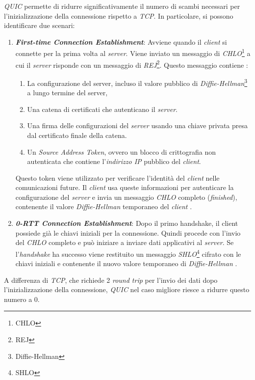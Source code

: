 \noindent \emph{QUIC} permette di ridurre significativamente il numero di scambi necessari per l'inizializzazione della connessione rispetto a \emph{TCP}. In particolare, si possono identificare due scenari:
\begin{enumerate}
    \item \textit{\textbf{First-time Connection Establishment}}: Avviene quando il \emph{client} si connette per la prima volta al \emph{server}. Viene inviato un messaggio di \emph{CHLO}\footnote{\gls{CHLO}} a cui il \emph{server} risponde con un messaggio di \emph{REJ}\footnote{\gls{REJ}}. 
    Questo messaggio contiene : 

        \begin{enumerate}[label=\roman*]
            \item La configurazione del server, incluso il valore pubblico di \emph{Diffie-Hellman}\footnote{\gls{Diffie-Hellman}} a lungo termine del server,
            \item Una catena di certificati che autenticano il \emph{server}.
            \item Una firma delle configurazioni del \emph{server} usando una chiave privata presa dal certificato finale della catena.
            \item Un \emph{Source Address Token}, ovvero un blocco di crittografia non autenticata che contiene l'\emph{indirizzo IP} pubblico del \emph{client}.
        \end{enumerate}
        
    Questo token viene utilizzato per verificare l'identità del \emph{client} nelle comunicazioni future. Il \emph{client} usa queste informazioni per autenticare la configurazione del \emph{server} e invia un messaggio \emph{CHLO} completo (\emph{finished}), contenente il valore \emph{Diffie-Hellman} temporaneo del \emph{client} \cite{article:handshake}.
    \item \textit{\textbf{0-RTT Connection Establishment}}: Dopo il primo handshake, il client possiede già le chiavi iniziali per la connessione. Quindi procede con l'invio del \emph{CHLO} completo e può iniziare a inviare dati applicativi al \emph{server}.
    Se l'\emph{handshake} ha successo viene restituito un messaggio \emph{SHLO}\footnote{\gls{SHLO}} cifrato con le chiavi iniziali e contenente il nuovo valore temporaneo di \emph{Diffie-Hellman} \cite{article:handshake}.
\end{enumerate}

\noindent A differenza di \emph{TCP}, che richiede 2 \emph{round trip} per l'invio dei dati dopo l'inizializzazione della connessione, \emph{QUIC} nel caso migliore riesce a ridurre questo numero a 0.

